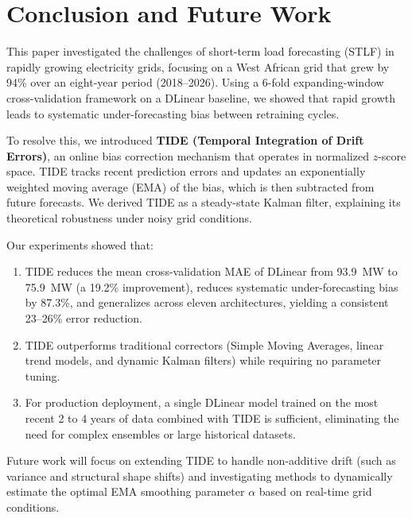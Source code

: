 \documentclass[journal]{IEEEtran}
\begin{document}
\begin{table}[t]
\section{Conclusion and Future Work}
This paper investigated the challenges of short-term load forecasting (STLF) in rapidly growing electricity grids, focusing on a West African grid that grew by 94\% over an eight-year period (2018--2026). Using a 6-fold expanding-window cross-validation framework on a DLinear baseline, we showed that rapid growth leads to systematic under-forecasting bias between retraining cycles.

To resolve this, we introduced \textbf{TIDE (Temporal Integration of Drift Errors)}, an online bias correction mechanism that operates in normalized $z$-score space. TIDE tracks recent prediction errors and updates an exponentially weighted moving average (EMA) of the bias, which is then subtracted from future forecasts. We derived TIDE as a steady-state Kalman filter, explaining its theoretical robustness under noisy grid conditions.

Our experiments showed that:
\begin{enumerate}
    \item TIDE reduces the mean cross-validation MAE of DLinear from 93.9~MW to 75.9~MW (a 19.2\% improvement), reduces systematic under-forecasting bias by 87.3\%, and generalizes across eleven architectures, yielding a consistent 23--26\% error reduction.
    \item TIDE outperforms traditional correctors (Simple Moving Averages, linear trend models, and dynamic Kalman filters) while requiring no parameter tuning.
    \item For production deployment, a single DLinear model trained on the most recent 2 to 4 years of data combined with TIDE is sufficient, eliminating the need for complex ensembles or large historical datasets.
\end{enumerate}

Future work will focus on extending TIDE to handle non-additive drift (such as variance and structural shape shifts) and investigating methods to dynamically estimate the optimal EMA smoothing parameter $\alpha$ based on real-time grid conditions.


\end{table}
\end{document}
